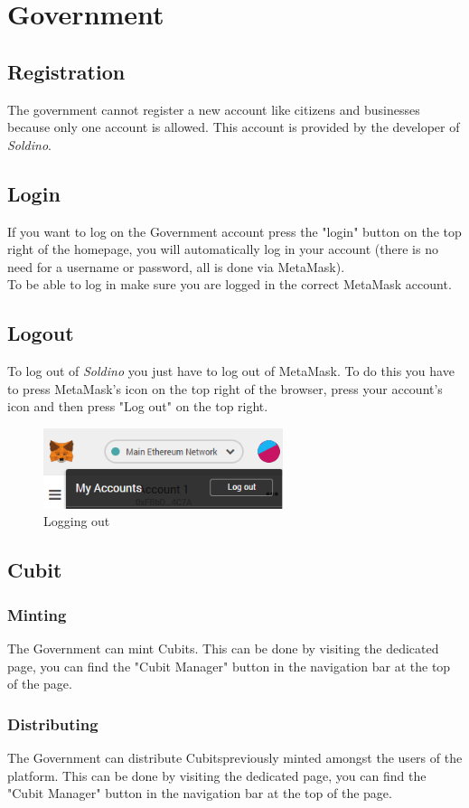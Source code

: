\section{Government}
	\subsection{Registration}
	The government cannot register a new account like citizens and 
	businesses because only one account is allowed. This account is provided 
	by the developer of \textit{Soldino}.
	\subsection{Login}
	If you want to log on the Government account press the "login" button on the 
	top right of the homepage, you will automatically log in your account 
	(there is no need for a username or password, all is done via MetaMask). 
	\\To be able to log in make sure you are logged in the correct MetaMask\glosp 
	account.
	\subsection{Logout}
	To log out of \textit{Soldino} you just have to log out of 
	MetaMask\glosp. To do this you have to press MetaMask's icon on the top 
	right of the browser, press your account's icon and then press "Log out"
	on the top right.
	\begin{figure}[H]
		\includegraphics[width=7cm]{res/images/logout_metamask.png}
		\centering
		\caption{Logging out}
	\end{figure}
	\subsection{Cubit}
		\subsubsection{Minting}
		The Government can mint Cubits\glo. This can be done by visiting the dedicated page, you can find the "Cubit Manager" button in the navigation bar at the top of the page.
%		
		\subsubsection{Distributing}
		The Government can distribute Cubits\glosp previously minted amongst the users 
		of the platform. This can be done by visiting the dedicated page, you can find the "Cubit Manager" button in the navigation bar at the top of the page.
%		
